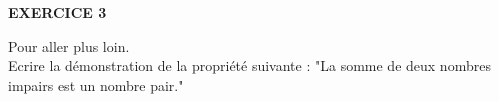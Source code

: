 \documentclass[a4paper,11pt]{article}
\begin{document}
\vspace*{1cm}

\begin{large}
\textbf{EXERCICE 3}\\
\end{large}
Pour aller plus loin.\\
 Ecrire la démonstration de la propriété suivante : "La somme de deux nombres impairs est un nombre pair."\\
\end{document}
